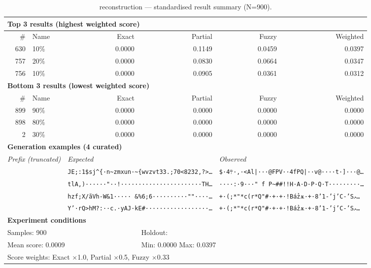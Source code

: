 \begin{table}[htbp]
\centering
\caption{reconstruction — standardised result summary (N=900).}
\label{tab:reconstruction_summary}
\begin{adjustbox}{max width=\textwidth}
\begin{tabular}{r p{5cm} r r r r}
\toprule
\multicolumn{6}{l}{\textbf{Top 3 results (highest weighted score)}} \\
\midrule
\# & Name & Exact & Partial & Fuzzy & Weighted \\
\midrule
630 & 10\% & 0.0000 & 0.1149 & 0.0459 & 0.0397 \\
757 & 20\% & 0.0000 & 0.0830 & 0.0664 & 0.0347 \\
756 & 10\% & 0.0000 & 0.0905 & 0.0361 & 0.0312 \\
\midrule
\multicolumn{6}{l}{\textbf{Bottom 3 results (lowest weighted score)}} \\
\midrule
\# & Name & Exact & Partial & Fuzzy & Weighted \\
\midrule
899 & 90\% & 0.0000 & 0.0000 & 0.0000 & 0.0000 \\
898 & 80\% & 0.0000 & 0.0000 & 0.0000 & 0.0000 \\
2 & 30\% & 0.0000 & 0.0000 & 0.0000 & 0.0000 \\
\midrule
\multicolumn{6}{l}{\textbf{Generation examples (4 curated)}} \\
\midrule
\multicolumn{2}{l}{\textit{Prefix (truncated)}} & \multicolumn{2}{l}{\textit{Expected}} & \multicolumn{2}{l}{\textit{Observed}} \\
\midrule
\multicolumn{2}{l}{\texttt{}} & \multicolumn{2}{l}{\texttt{JE;:1\$sj\^{}\{·n\textasciitilde{}zmxun·\textasciitilde{}\{wvzvt33.;70<8232,?>\ldots}} & \multicolumn{2}{l}{\texttt{\$·4܊·,·<Al|···@FPV··4fPQ|··v@····t·]···@\ldots}} \\
\multicolumn{2}{l}{\texttt{}} & \multicolumn{2}{l}{\texttt{tlA,)······"··!·······················TH\ldots}} & \multicolumn{2}{l}{\texttt{····:·9···" f P\textasciitilde{}\#\#!!H·A·D·P·Q·T·········\ldots}} \\
\multicolumn{2}{l}{\texttt{}} & \multicolumn{2}{l}{\texttt{hzf;X/ãVh-W\&1····· \&\%6;6··········""····\ldots}} & \multicolumn{2}{l}{\texttt{+·(;*"*c(r*Q"\#·+·+·!Bá̉zѫ·+·8'1-'j'C-'Ѕޅ\ldots}} \\
\multicolumn{2}{l}{\texttt{}} & \multicolumn{2}{l}{\texttt{Y'·rQ>hM?:··c.·yAJ·kE\#··················\ldots}} & \multicolumn{2}{l}{\texttt{+·(;*"*c(r*Q"\#·+·+·!Bá̉zѫ·+·8'1-'j'C-'Ѕޅ\ldots}} \\
\midrule
\multicolumn{6}{l}{\textbf{Experiment conditions}} \\
\midrule
\multicolumn{3}{l}{Samples: 900} & \multicolumn{3}{l}{Holdout: } \\
\multicolumn{3}{l}{Mean score: 0.0009} & \multicolumn{3}{l}{Min: 0.0000 \quad Max: 0.0397} \\
\multicolumn{6}{l}{Score weights: Exact $\times$1.0, Partial $\times$0.5, Fuzzy $\times$0.33} \\
\bottomrule
\end{tabular}
\end{adjustbox}
\end{table}
